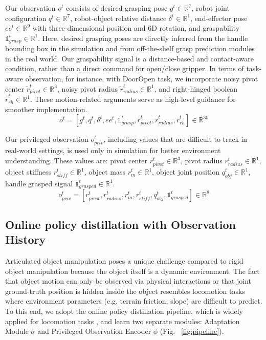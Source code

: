 Our observation $o^t$ consists of desired grasping pose $g^t \in \mathbb{R}^7$, robot joint configuration $q^t \in \mathbb{R}^7$, robot-object relative distance $\delta^t \in \mathbb{R}^1$, end-effector pose $ee^t \in \mathbb{R}^9$ with three-dimensional position and 6D rotation, and graspability $ \mathds{1}^t_{grasp} \in \mathbb{R}^1$. Here, desired grasping poses are directly inferred from the handle bounding box in the simulation and from off-the-shelf grasp prediction modules in the real world. Our graspability signal is a distance-based and contact-aware condition, rather than a direct command for open/close gripper. In terms of task-aware observation, for instance, with DoorOpen task, we incorporate noisy pivot center $\tilde{r}^t_{pivot} \in \mathbb{R}^3$, noisy pivot radius $\tilde{r}^t_{radius} \in \mathbb{R}^1$, and right-hinged boolean $\tilde{r}^t_{rh} \in \mathbb{R}^1$. These motion-related arguments serve as high-level guidance for smoother implementation. 
\[ o^t = [g^t, q^t, \delta^t, ee^t, \mathds{1}^t_{grasp}, \tilde{r}^t_{pivot}, \tilde{r}^t_{radius}, \tilde{r}^t_{rh} ] \in \mathbb{R}^{30} \]

Our privileged observation $o^t_{priv}$, including values that are difficult to track in real-world settings, is used only in simulation for better environment understanding. These values are: pivot center ${r}^t_{pivot} \in \mathbb{R}^3$, pivot radius ${r}^t_{radius} \in \mathbb{R}^1$, object stiffness ${r}^t_{stiff} \in \mathbb{R}^1$, object mass ${r}^t_{m} \in \mathbb{R}^1$, object joint position ${q}^t_{obj} \in \mathbb{R}^1$, handle grasped signal $ \mathds{1}^t_{grasped} \in \mathbb{R}^1$.
\[ o^t_{priv} = [{r}^t_{pivot}, {r}^t_{radius},  {r}^t_{m}, {r}^t_{stiff}, {q}^t_{obj}, \mathds{1}^t_{grasped} ] \in \mathbb{R}^{8} \]

\subsection{Online policy distillation with Observation History} \label{method:distillation}
 Articulated object manipulation poses a unique challenge compared to rigid object manipulation because the object itself is a dynamic environment. The fact that object motion can only be observed via physical interactions or that joint ground-truth position is hidden inside the object resembles locomotion tasks where environment parameters (e.g. terrain friction, slope) are difficult to predict. To this end, we adopt the online policy distillation pipeline, which is widely applied for locomotion tasks \cite{deepwholebodycontrol, forcecontrolepfl, agilebutsafe}, and learn two separate modules: Adaptation Module $\sigma$ and Privileged Observation Encoder $\phi$ (Fig. ~\ref{fig:pipeline}).

